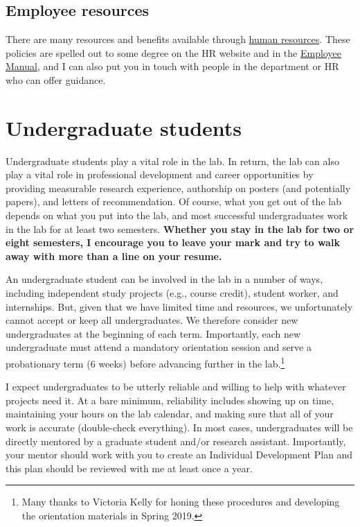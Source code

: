 \documentclass[letterpaper,12pt,oneside]{memoir}
\begin{document}
\subsection{Employee resources}

There are many resources and benefits available through \href{https://www.temple.edu/faculty-and-staff/working-temple/human-resources}{human resources}. These policies are spelled out to some degree on the HR website and in the \href{http://www.temple.edu/hr/departments/employeerelations/documents/Employee_Manual_Feb_2016.pdf}{Employee Manual}, and I can also put you in touch with people in the department or HR who can offer guidance.


\section{Undergraduate students}

Undergraduate students play a vital role in the lab. In return, the lab can also play a vital role in professional development and career opportunities by providing measurable research experience, authorship on posters (and potentially papers), and letters of recommendation. Of course, what you get out of the lab depends on what you put into the lab, and most successful undergraduates work in the lab for at least two semesters. \textbf{Whether you stay in the lab for two or eight semesters, I encourage you to leave your mark and try to walk away with more than a line on your resume.}

An undergraduate student can be involved in the lab in a number of ways, including independent study projects (e.g., course credit), student worker, and internships. But, given that we have limited time and resources, we unfortunately cannot accept or keep all undergraduates. We therefore consider new undergraduates at the beginning of each term. Importantly, each new undergraduate must attend a mandatory orientation session and serve a probationary term (6 weeks) before advancing further in the lab.\footnote{Many thanks to Victoria Kelly for honing these procedures and developing the orientation materials in Spring 2019.}

I expect undergraduates to be utterly reliable and willing to help with whatever projects need it. At a bare minimum, reliability includes showing up on time, maintaining your hours on the lab calendar, and making sure that all of your work is accurate (double-check everything). In most cases, undergraduates will be directly mentored by a graduate student and/or research assistant. Importantly, your mentor should work with you to create an Individual Development Plan and this plan should be reviewed with me at least once a year.
\end{document}
